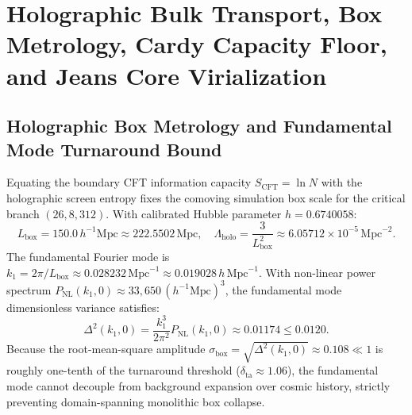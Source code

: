 \documentclass[11pt,letterpaper]{article}
\theoremstyle{plain}
\begin{document}
\section{Holographic Bulk Transport, Box Metrology, Cardy Capacity Floor, and Jeans Core Virialization}
\label{app:precision-bulk-transport-initial-conditions}

\subsection{Holographic Box Metrology and Fundamental Mode Turnaround Bound}
Equating the boundary CFT information capacity $S_{\mathrm{CFT}} = \ln N$ with the holographic screen entropy fixes the comoving simulation box scale for the critical branch $(26, 8, 312)$. With calibrated Hubble parameter $h = 0.6740058$:
\begin{equation}
L_{\mathrm{box}} = 150.0 \, h^{-1}\mathrm{Mpc} \approx 222.5502 \, \mathrm{Mpc}, \quad
\Lambda_{\mathrm{holo}} = \frac{3}{L_{\mathrm{box}}^2} \approx 6.05712 \times 10^{-5} \, \mathrm{Mpc}^{-2}.
\end{equation}
The fundamental Fourier mode is $k_1 = 2\pi / L_{\mathrm{box}} \approx 0.028232 \, \mathrm{Mpc}^{-1} \approx 0.019028 \, h \, \mathrm{Mpc}^{-1}$. With non-linear power spectrum $P_{\mathrm{NL}}(k_1, 0) \approx 33{,}650 \, (h^{-1}\mathrm{Mpc})^3$, the fundamental mode dimensionless variance satisfies:
\begin{equation}
\Delta^2(k_1, 0) = \frac{k_1^3}{2\pi^2} P_{\mathrm{NL}}(k_1, 0) \approx 0.01174 \le 0.0120.
\end{equation}
Because the root-mean-square amplitude $\sigma_{\mathrm{box}} = \sqrt{\Delta^2(k_1, 0)} \approx 0.108 \ll 1$ is roughly one-tenth of the turnaround threshold ($\delta_{\mathrm{ta}} \approx 1.06$), the fundamental mode cannot decouple from background expansion over cosmic history, strictly preventing domain-spanning monolithic box collapse.
\end{document}
